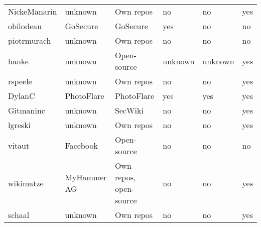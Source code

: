 \begin{landscape}
\begin{table}[]
\begin{tabular}{llllll}
            NickeManarin  & unknown       & Own repos                          & no              & no                     & yes            \\
            obilodeau     & GoSecure      & GoSecure                           & yes             & no                     & no             \\
            piotrmurach   & unknown       & Own repos                          & no              & no                     & no             \\
            hauke         & unknown       & Open-source                        & unknown         & unknown                & yes            \\
            rspeele       & unknown       & Own repos                          & no              & no                     & yes            \\
            DylanC        & PhotoFlare    & PhotoFlare                         & yes             & yes                    & yes            \\
            Gitmaninc     & unknown       & SecWiki                            & no              & no                     & yes            \\
            lgreski       & unknown       & Own repos                          & no              & no                     & yes            \\
            vitaut        & Facebook      & Open-source                        & no              & no                     & no             \\
            wikimatze     & MyHammer AG   & Own repos, open-source             & no              & no                     & yes            \\
            schaal        & unknown       & Own repos                          & no              & no                     & yes            \\
            \bottomrule
        \end{tabular}
    \end{table}
\end{landscape}
